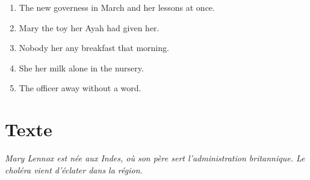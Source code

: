 \documentclass{fiche}
\begin{document}
\begin{anglais}
\begin{enumerate}[label=\arabic*.,itemsep=2mm,leftmargin=*]
  \item The new governess  in March and  her lessons at once.
  \item Mary  the toy her Ayah had given her.
  \item Nobody  her any breakfast that morning.
  \item She  her milk alone in the nursery.
  \item The officer  away without a word.
\end{enumerate}
\end{anglais}

\newpage
\section{Texte}

\noindent\small\textit{Mary Lennox est née aux Indes, où son père sert l'administration
britannique. Le choléra vient d'éclater dans la région.}\normalsize
\end{document}
